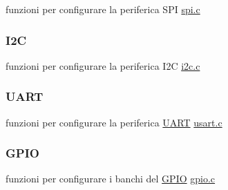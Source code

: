 \begin{DoxyItemize}
\item funzioni per configurare la periferica S\+PI \hyperlink{spi_8c}{spi.\+c} 
\end{DoxyItemize}\hypertarget{index_I2C}{}\subsubsection{I2C}\label{index_I2C}

\begin{DoxyItemize}
\item funzioni per configurare la periferica I2C \hyperlink{i2c_8c}{i2c.\+c} 
\end{DoxyItemize}\hypertarget{index_UART}{}\subsubsection{U\+A\+RT}\label{index_UART}

\begin{DoxyItemize}
\item funzioni per configurare la periferica \hyperlink{structUART}{U\+A\+RT} \hyperlink{usart_8c}{usart.\+c} 
\end{DoxyItemize}\hypertarget{index_GPIO}{}\subsubsection{G\+P\+IO}\label{index_GPIO}

\begin{DoxyItemize}
\item funzioni per configurare i banchi del \hyperlink{structGPIO}{G\+P\+IO} \hyperlink{gpio_8c}{gpio.\+c} 
\end{DoxyItemize}